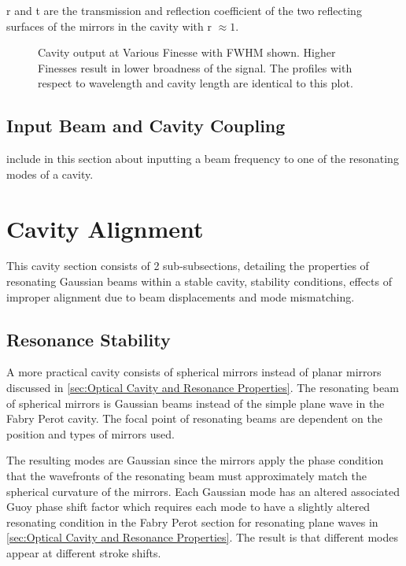 \documentclass[11pt,a4paper]{book}
\newcommand{\imginput}[1]{} %
\begin{document}
		r and t are the transmission and reflection coefficient of the two reflecting surfaces of the mirrors in the cavity with r $\approx 1$.
		
		\begin{figure} [!ht]
			\centering
			\def\svgwidth{\columnwidth}
			\resizebox{160mm}{!}{\imginput{images/cav-res-profiles.pdf_tex}}
			\caption{\cite{steck}Cavity output at Various Finesse with FWHM shown. Higher Finesses result in lower broadness of the signal. The profiles with respect to wavelength and cavity length are identical to this plot. }
			\label{fig:cav-res-profiles}
		\end{figure}			

		\subsection{Input Beam and Cavity Coupling}
			include in this section about inputting a beam frequency to one of the resonating modes of a cavity.
	\section{Cavity Alignment}
		\label{sec:Cavity Alignment}
		This cavity section consists of 2 sub-subsections, detailing the properties of resonating Gaussian beams within a stable cavity, stability conditions, effects of improper alignment due to beam displacements and mode mismatching.
	
		\subsection {Resonance Stability}
			\label{ssec:ResonaceSability}
			A more practical cavity consists of spherical mirrors instead of planar mirrors discussed in \autoref{sec:Optical Cavity and Resonance Properties}. 
			The resonating beam of spherical mirrors is Gaussian beams instead of the simple plane wave in the Fabry Perot cavity. The focal point of resonating beams are dependent on the position and types of mirrors used. 
			
			The resulting modes are Gaussian since the mirrors apply the phase condition that the wavefronts of the resonating beam must approximately match the spherical curvature of the mirrors.
			Each Gaussian mode has an altered associated Guoy phase shift factor which requires each mode to have a slightly altered resonating condition in the Fabry Perot section for resonating plane waves in \autoref{sec:Optical Cavity and Resonance Properties}. The result is that different modes appear at different stroke shifts.
			
\end{document}
